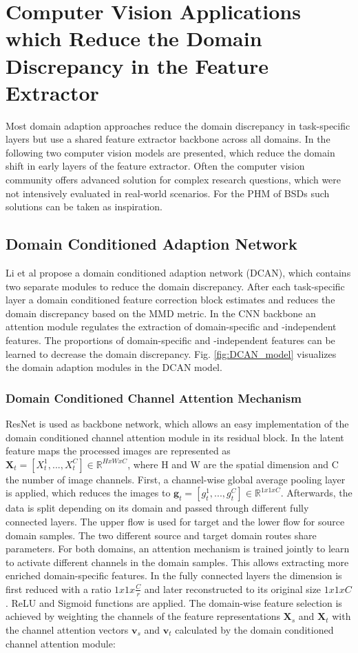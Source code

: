 \section{Computer Vision Applications which Reduce the Domain Discrepancy in the Feature Extractor}
Most domain adaption approaches reduce the domain discrepancy in task-specific layers but use a shared feature extractor backbone across all domains. In the following two computer vision models are presented, which reduce the domain shift in early layers of the feature extractor. Often the computer vision community offers advanced solution for complex research questions, which were not intensively evaluated in real-world scenarios. For the PHM of BSDs such solutions can be taken as inspiration.

\subsection{Domain Conditioned Adaption Network}
Li et al \cite{li2020} propose a domain conditioned adaption network (DCAN), which contains two separate modules to reduce the domain discrepancy. After each task-specific layer a domain conditioned feature correction block estimates and reduces the domain discrepancy based on the MMD metric. In the CNN backbone an attention module regulates the extraction of domain-specific and -independent features. The proportions of domain-specific and -independent features can be learned to decrease the domain discrepancy. Fig. \ref{fig:DCAN_model} visualizes the domain adaption modules in the DCAN model.

\subsubsection{Domain Conditioned Channel Attention Mechanism}
ResNet is used as backbone network, which allows an easy implementation of the domain conditioned channel attention module in its residual block. In the latent feature maps the processed images are represented as $\pmb{X}_{t} = [X^{1}_{t},...,X^{C}_{t}] \in \mathbb{R}^{HxWxC}$, where H and W are the spatial dimension and C the number of image channels. First, a channel-wise global average pooling layer is applied, which reduces the images to  $\pmb{g}_{t} = [g^{1}_{t},...,g^{C}_{t}] \in \mathbb{R}^{1x1xC}$. Afterwards, the data is split depending on its domain and passed through different fully connected layers. The upper flow is used for target and the lower flow for source domain samples. The two different source and target domain routes share parameters. For both domains, an attention mechanism is trained jointly to learn to activate different channels in the domain samples. This allows extracting more enriched domain-specific features. In the fully connected layers the dimension is first reduced with a ratio ${1x1x\frac{C}{r}}$ and later reconstructed to its original size ${1x1xC}$. ReLU and Sigmoid functions are applied. The domain-wise feature selection is achieved by weighting the channels of the feature representations $\pmb{X}_{s}$ and $\pmb{X}_{t}$ with the channel attention vectors $\pmb{v}_{s}$ and $\pmb{v}_{t}$ calculated by the domain conditioned channel attention module:

